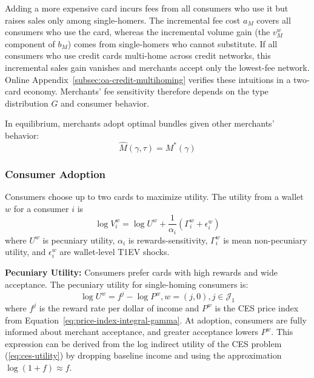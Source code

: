 \documentclass[main.tex]{subfiles}
\begin{document}
Adding a more expensive card incurs fees from all consumers who use it but raises sales only among single-homers.
The incremental fee cost $a_M$ covers all consumers who use the card, whereas the incremental volume gain (the $v_M^w$ component of $b_M$) comes from single-homers who cannot substitute.
If all consumers who use credit cards multi-home across credit networks, this incremental sales gain vanishes and merchants accept only the lowest-fee network.
Online Appendix~\ref{subsec:oa-credit-multihoming} verifies these intuitions in a two-card economy.
Merchants' fee sensitivity therefore depends on the type distribution $G$ and consumer behavior.

In equilibrium, merchants adopt optimal bundles given other merchants' behavior:
\begin{equation} 
\widehat{M}\left(\gamma,\tau\right)=M^{*}\left(\gamma\right)\label{eq:adoption-eqm} 
\end{equation}

\subsubsection{Consumer Adoption}
\label{subsubsec:cons-adopt}

Consumers choose up to two cards to maximize utility.
The utility from a wallet $w$ for a consumer $i$ is
\begin{equation}
  \log V_{i}^{w}=\log U^w +\frac{1}{\alpha_{i}}\left(\Gamma_{i}^{w}+\epsilon_{i}^{w}\right)\label{eq:wallet-utility}
\end{equation}
where $U^w$ is pecuniary utility, $\alpha_i$ is rewards-sensitivity, $\Gamma_i^w$ is mean non-pecuniary utility, and $\epsilon_i^w$ are wallet-level T1EV shocks.

\vspace{0.1in}

\noindent \textbf{Pecuniary Utility: }\hspace{0.2in}
Consumers prefer cards with high rewards and wide acceptance.
The pecuniary utility for single-homing consumers is:
\begin{equation}
  \log U^{w}=f^{j}-\log P^{w},w = (j,0),j\in\mathcal{J}_1 \label{eq:pecuniary-definition}
\end{equation}
where $f^j$ is the reward rate per dollar of income and $P^w$ is the CES price index from Equation~\ref{eq:price-index-integral-gamma}.
At adoption, consumers are fully informed about merchant acceptance, and greater acceptance lowers $P^w$.
This expression can be derived from the log indirect utility of the CES problem (\ref{eq:ces-utility}) by dropping baseline income and using the approximation $\log\left(1+f\right)\approx f$.
\end{document}
